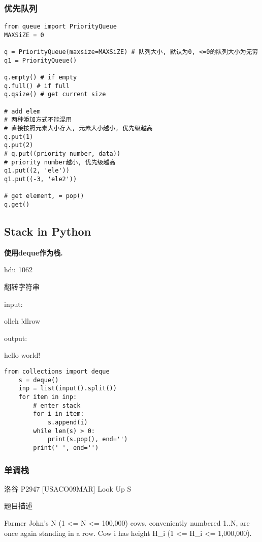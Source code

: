 \documentclass[../main]{subfiles}
\begin{document}
\subsubsection{优先队列}

\begin{lstlisting}[style = Python]
from queue import PriorityQueue
MAXSiZE = 0

q = PriorityQueue(maxsize=MAXSiZE) # 队列大小, 默认为0, <=0的队列大小为无穷
q1 = PriorityQueue()

q.empty() # if empty
q.full() # if full
q.qsize() # get current size

# add elem
# 两种添加方式不能混用
# 直接按照元素大小存入, 元素大小越小, 优先级越高
q.put(1) 
q.put(2)
# q.put((priority number, data))
# priority number越小, 优先级越高
q1.put((2, 'ele'))
q1.put((-3, 'ele2'))

# get element, = pop()
q.get()
\end{lstlisting}

\subsection{Stack in Python}

\textbf{使用deque作为栈.}

\indent\par

hdu 1062

翻转字符串

input:

olleh !dlrow

output:

hello world!

\begin{lstlisting}[style = Python]
from collections import deque
    s = deque()
    inp = list(input().split())
    for item in inp:
        # enter stack
        for i in item:
            s.append(i)
        while len(s) > 0:
            print(s.pop(), end='')
        print(' ', end='')
\end{lstlisting}

\subsubsection{单调栈}

洛谷 P2947 [USACO09MAR] Look Up S

题目描述

Farmer John's N (1 <= N <= 100,000) cows, conveniently numbered 1..N, are once again standing in a row. Cow i has height H\_i (1 <= H\_i <= 1,000,000).
\end{document}
